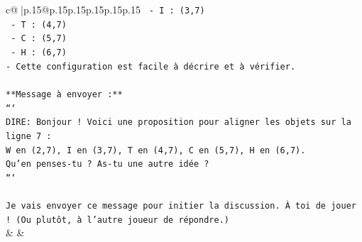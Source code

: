 \documentclass{article}
\begin{document}
{\begin{supertabular}{c@{$\;$}|p{.15\linewidth}@{}p{.15\linewidth}p{.15\linewidth}p{.15\linewidth}p{.15\linewidth}p{.15\linewidth}}
{{{\texttt{  {-} I : (3,7)} \\
\texttt{  {-} T : (4,7)} \\
\texttt{  {-} C : (5,7)} \\
\texttt{  {-} H : (6,7)} \\
\texttt{{-} Cette configuration est facile à décrire et à vérifier.} \\
\\ 
\texttt{**Message à envoyer :**} \\
\texttt{```} \\
\texttt{DIRE: Bonjour ! Voici une proposition pour aligner les objets sur la ligne 7 :} \\
\texttt{W en (2,7), I en (3,7), T en (4,7), C en (5,7), H en (6,7).} \\
\texttt{Qu'en penses{-}tu ? As{-}tu une autre idée ?} \\
\texttt{```} \\
\\ 
\texttt{Je vais envoyer ce message pour initier la discussion. À toi de jouer ! (Ou plutôt, à l'autre joueur de répondre.)} \\
            }
        }
    }
    & & \\ \\


\end{supertabular}}
\end{document}
